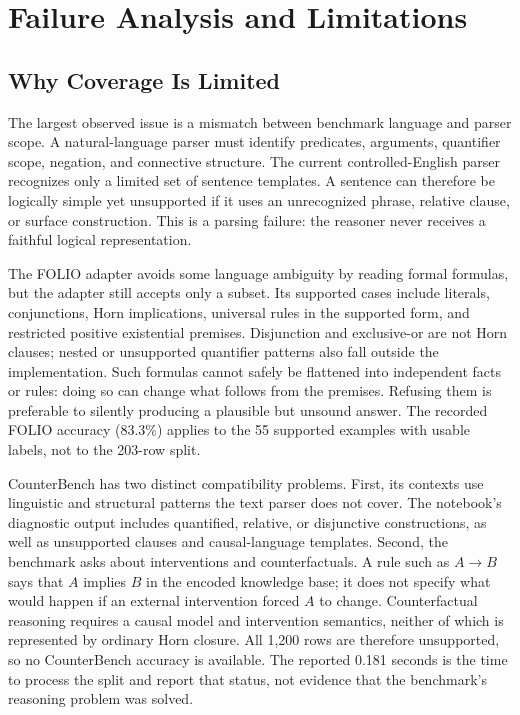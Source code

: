 \documentclass[10pt,twocolumn,letterpaper]{article}
\begin{document}
\section{Failure Analysis and Limitations}
\subsection{Why Coverage Is Limited}
The largest observed issue is a mismatch between benchmark language and parser scope. A natural-language parser must identify predicates, arguments, quantifier scope, negation, and connective structure. The current controlled-English parser recognizes only a limited set of sentence templates. A sentence can therefore be logically simple yet unsupported if it uses an unrecognized phrase, relative clause, or surface construction. This is a parsing failure: the reasoner never receives a faithful logical representation.

The FOLIO adapter avoids some language ambiguity by reading formal formulas, but the adapter still accepts only a subset. Its supported cases include literals, conjunctions, Horn implications, universal rules in the supported form, and restricted positive existential premises. Disjunction and exclusive-or are not Horn clauses; nested or unsupported quantifier patterns also fall outside the implementation. Such formulas cannot safely be flattened into independent facts or rules: doing so can change what follows from the premises. Refusing them is preferable to silently producing a plausible but unsound answer. The recorded FOLIO accuracy (83.3\%) applies to the 55 supported examples with usable labels, not to the 203-row split.

CounterBench has two distinct compatibility problems. First, its contexts use linguistic and structural patterns the text parser does not cover. The notebook's diagnostic output includes quantified, relative, or disjunctive constructions, as well as unsupported clauses and causal-language templates. Second, the benchmark asks about interventions and counterfactuals. A rule such as $A\rightarrow B$ says that $A$ implies $B$ in the encoded knowledge base; it does not specify what would happen if an external intervention forced $A$ to change. Counterfactual reasoning requires a causal model and intervention semantics, neither of which is represented by ordinary Horn closure. All 1,200 rows are therefore unsupported, so no CounterBench accuracy is available. The reported 0.181 seconds is the time to process the split and report that status, not evidence that the benchmark's reasoning problem was solved.
\end{document}
